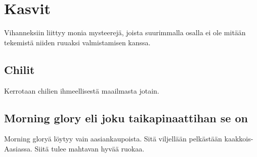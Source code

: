 \documentclass[../keittiokirja.tex]{subfiles}
\begin{document}
\chapter{Kasvit}
\label{chp:kasvit}

Vihanneksiin liittyy monia mysteerejä, joista suurimmalla osalla ei ole mitään tekemistä niiden 
ruuaksi valmistamisen kanssa. 


\blindtext

\section{Chilit}
\label{sec:chilit}

Kerrotaan chilien ihmeellisestä maailmasta jotain.


\blindtext

\section{Morning glory eli joku taikapinaattihan se on}


Morning gloryä löytyy vain aasiankaupoista. Sitä viljellään pelkästään kaakkois-Aasiassa.
Siitä tulee mahtavan hyvää ruokaa.

\blindtext
\end{document}
